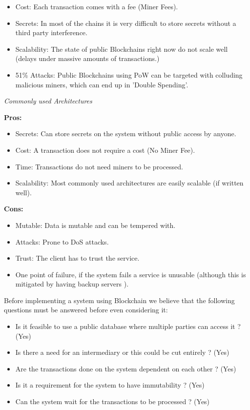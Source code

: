 \begin{itemize}
    \item Cost: Each transaction comes with a fee (Miner Fees). 
    \item Secrets: In most of the chains it is very difficult to store secrets without a third party interference. 
    \item Scalability: The state of public Blockchains right now do not scale well (delays under massive amounts of transactions.)
    \item 51\% Attacks: Public Blockchains using PoW can be targeted with colluding malicious miners, which can end up in 'Double Spending'. 
\end{itemize}

\noindent
\textit{Commonly used Architectures}

\noindent 
\textbf{Pros:}
\begin{itemize}
    \item Secrets: Can store secrets on the system without public access by anyone.
    \item Cost: A transaction does not require a cost (No Miner Fee). 
    \item Time: Transactions do not need miners to be processed. 
    \item Scalability: Most commonly used architectures are easily scalable (if written well). 
\end{itemize}

\noindent 
\textbf{Cons:}
\begin{itemize}
    \item Mutable: Data is mutable and can be tempered with.
    \item Attacks: Prone to DoS attacks. 
    \item Trust: The client has to trust the service. 
    \item One point of failure, if the system fails a service is unusable (although this is mitigated by having backup servers ). 
\end{itemize}

\noindent
Before implementing a system using Blockchain we believe that the following questions must be answered before even considering it: 
\begin{itemize}
  \item Is it feasible to use a public database where multiple parties can access it ? (Yes) 
  \item Is there a need for an intermediary or this could be cut entirely ? (Yes)
  \item Are the transactions done on the system dependent on each other ? (Yes)
  \item Is it a requirement for the system to have immutability ? (Yes)
  \item Can the system wait for the transactions to be processed ? (Yes)
\end{itemize}


